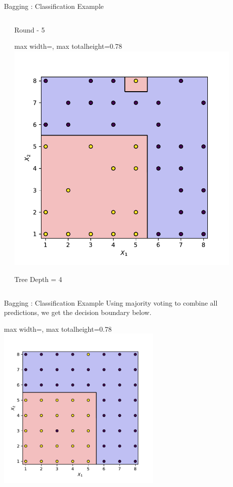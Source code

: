 \documentclass[9pt]{beamer}
\newcommand{\fitpic}[1]{\begin{adjustbox}{max width=\linewidth, max totalheight=0.78\textheight}#1\end{adjustbox}}
\begin{document}
\begin{frame}{Bagging : Classification Example}
\begin{columns}
\begin{column}{0.3\textwidth}
    \end{column}
    \pause  \begin{column}{0.3\textwidth}
      \centering
      Round - 5\\

      \fitpic{\includegraphics[width = 0.9\textwidth]{../assets/ensemble/figures/decision-boundary-4}}
      Tree Depth = 4

    \end{column}

  \end{columns}
\end{frame}

\begin{frame}{Bagging : Classification Example}
  Using majority voting to combine all predictions, we get the decision boundary below.\\
  \vspace{0.5cm}
  \centering
  \fitpic{\includegraphics[width = 0.6\textwidth]{../assets/ensemble/figures/decision-boundary-ensemble}}
\end{frame}
\end{document}
